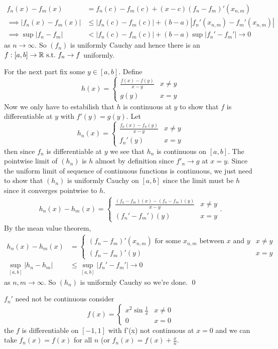 \documentclass{article}
\begin{document}
\begin{align*}
	f_n(x)-f_m(x)&=f_n(c)-f_m(c)+(x-c)(f_n-f_m)'(x_{n,m}) \\
	\implies |f_n(x)-f_m(x)|&\le |f_n(c)-f_m(c)|+(b-a)|f_n'(x_{n,m})-f_m'(x_{n,m})|\\
	\implies \sup|f_n-f_m|&<|f_n(c)-f_m(c)|+(b-a)\sup|f_n'-f_m'|\to 0
\end{align*}
as $ n\to\infty $. So $ (f_n) $ is uniformly Cauchy and hence there is an $ f : [a,b]\to \mathbb{R} \text{ s.t.\ } f_n\to f$ uniformly.\par
For the next part fix some $ y\in [a,b] $. Define
\[
  h(x)=\begin{cases}
	  \frac{f(x)-f(y)}{x-y} & x\ne y \\
	  g(y) & x=y
  \end{cases}
\]
Now we only have to estabilish that $ h $ is continuous at $ y $ to show that $ f $ is differentiable at $ y $ with $ f'(y)=g(y) $. Let
\[
  h_n(x)=\begin{cases}
	  \frac{f_n(x)-f_n(y)}{x-y} & x\ne y\\
	  f_n'(y) & x = y 
  \end{cases}
\]
then since $ f_n $ is differentiable at $ y $ we see that $ h_n $ is continuous on $ [a,b] $. The pointwise limit of $ (h_n) $ is $ h $ almost by definition since $ f'_n\to g $ at $ x=y $. Since the uniform limit of sequence of continuous functions is continuous, we just need to show that $ (h_n) $ is uniformly Cauchy on $ [a,b] $ since the limit must be $ h $ since it converges pointwise to $ h $.
\begin{align*}
  h_n(x)-h_m(x)=\begin{cases}
	  \frac{(f_n-f_m)(x)-(f_n-f_m)(y)}{x-y} & x\ne y \\
	  (f_n'-f_m')(y) & x=y
  \end{cases}.
\end{align*}
By the mean value theorem,
\begin{align*}
	h_n(x)-h_m(x)&=\begin{cases}
	  (f_n-f_m)'(x_{n,m}) \text{ for some } x_{n,m} \text{ between } x \text{ and } y & x\ne y\\
	  (f_n-f_m)'(y) & x=y
  \end{cases}\\
		\sup_{[a,b]}|h_n-h_m|&\le \sup_{[a,b]}|f_n'-f_m'|\to 0
\end{align*}
as $ n,m\to \infty $. So $ (h_n) $ is uniformly Cauchy so we're done. \qed
\begin{remark}
  $ f_n' $ need not be continuous consider
  \[
    f(x)=\begin{cases}
	    x^2\sin \frac 1x & x\ne 0 \\
	    0 & x = 0
    \end{cases}
  \]
  the $ f $ is differentiable on $ [-1,1] $ with f'(x) not continuous at $ x=0 $ and we can take $ f_n(x)=f(x) $ for all $ n $ (or $ f_n(x)=f(x)+\frac xn $.
\end{remark}
\end{document}
